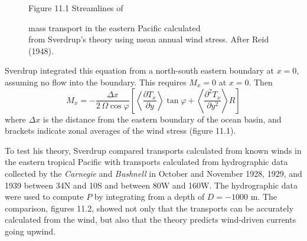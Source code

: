 \begin{figure}[t!]
\centering
\footnotesize
Figure 11.1 Streamlines of \rule{0mm}{3ex}mass
transport in the eastern Pacific
calculated\\from Sverdrup's theory using mean annual wind
stress. After Reid (1948).

\label{fig:sverdrupmap}
\vspace{-3ex}
\end{figure}

Sverdrup integrated this equation from a north-south eastern boundary
at $ x = 0$, assuming no flow into the boundary. This requires $M_x = 0$
at $x = 0$. Then
\begin{equation}
M_x =- \frac{\Delta{x}}{2\,\Omega\cos\varphi}\left[ \left<
\frac{\partial{T_x}}{\partial{y}}\right > \tan\varphi +
\left< \frac{\partial^2{T_x}}{\partial{y}^2} \right> R \right]
\end{equation}
where $\Delta x$ is the distance from the eastern boundary of the
ocean basin, and brackets indicate zonal averages of the wind
stress (figure 11.1).

To test his theory, Sverdrup compared
transports calculated from known winds in
the eastern tropical Pacific with transports calculated from
hydrographic data collected by
the \textit{Carnegie} and \textit{Bushnell} in October and November
1928, 1929, and 1939 between 34\degrees N and 10\degrees S and between
80\degrees W and 160\degrees W. The hydrographic
data were used to
compute $P$ by integrating from a depth of $D = -1000$ m. The
comparison, figures 11.2, showed not only that the transports can be
accurately calculated from the wind, but also that the theory predicts
wind-driven currents going upwind.

